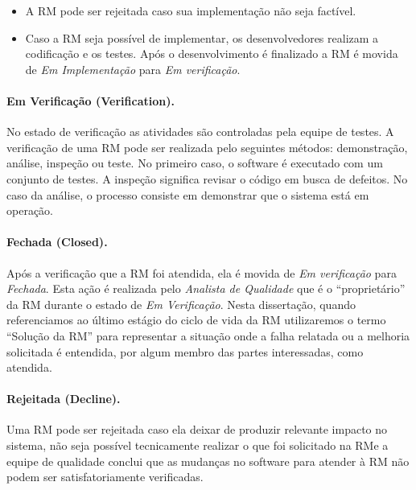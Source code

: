 \begin{itemize}
	\item A RM pode ser rejeitada caso sua implementação não seja factível.
    \item Caso a RM seja possível de implementar, os desenvolvedores realizam a
        codificação e os testes. Após o desenvolvimento é finalizado a RM é
        movida de \textit{Em Implementação} para \textit{Em verificação}.
\end{itemize}

\paragraph{Em Verificação (Verification).}
\label{par:em_verificacao}

No estado de verificação as atividades são controladas pela equipe de testes.  A
verificação de uma RM pode ser realizada pelo seguintes métodos: demonstração,
análise, inspeção ou teste. No primeiro caso, o software é executado com um
conjunto de testes. A inspeção significa revisar o código em busca de defeitos.
No caso da análise, o processo consiste em demonstrar que o sistema está em
operação.

\paragraph{Fechada (Closed).}
\label{par:fechada}

Após a verificação que a RM foi atendida, ela é movida de \textit{Em
    verificação} para \textit{Fechada}. Esta ação é realizada pelo
\textit{Analista de Qualidade} que é o ``proprietário'' da RM durante o estado
de \textit{Em Verificação}. Nesta dissertação, quando referenciamos ao último
estágio do ciclo de vida da RM utilizaremos o termo ``Solução da RM'' para
representar a situação onde a falha relatada ou a melhoria solicitada é
entendida, por algum membro das partes interessadas, como atendida.

\paragraph{Rejeitada (Decline).}
\label{par:rejeitada}

Uma RM pode ser rejeitada caso ela deixar de produzir relevante impacto no
sistema, não seja possível tecnicamente realizar o que foi solicitado na RM\@ e
a equipe de qualidade conclui que as mudanças no software para atender à RM não
podem ser satisfatoriamente verificadas.

